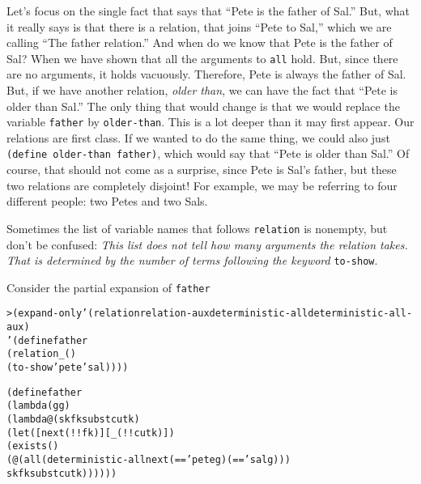 Let's focus on the single fact that says that ``Pete is the father of
Sal.''  But, what it really says is that there is a relation, that
joins ``Pete to Sal,'' which we are calling ``The father relation.''
And when do we know that Pete is the father of Sal?  When we have
shown that all the arguments to \texttt{all} hold.  But, since there
are no arguments, it holds vacuously.  Therefore, Pete is always the
father of Sal.  But, if we have another relation, \emph{older than},
we can have the fact that ``Pete is older than Sal.''  The only thing
that would change is that we would replace the variable
\texttt{father} by \texttt{older-than}.  This is a lot deeper than it
may first appear.  Our relations are first class.  If we wanted to do
the same thing, we could also just \texttt{(define older-than
father)}, which would say that ``Pete is older than Sal.''  Of course,
that should not come as a surprise, since Pete is Sal's father, but
these two relations are completely disjoint!  For example, we may be
referring to four different people: two Petes and two Sals.

Sometimes the list of variable names that follows \texttt{relation} is
nonempty, but don't be confused: \emph{This list does not tell how
many arguments the relation takes. That is determined by the number of
terms following the keyword} \texttt{to-show}.

Consider the partial expansion of \texttt{father}
\begin{alltt}
> (expand-only '(relation relation-aux deterministic-all deterministic-all-aux)
    '(define father  
       (relation _ ()
         (to-show 'pete 'sal))))
\end{alltt}

\begin{alltt}
(define father
  (lambda (g g)
    (lambda@ (sk fk subst cutk)
      (let ([next (!! fk)] [_ (!! cutk)])
        (exists ()
          (@ (all (deterministic-all next (== 'pete g) (== 'sal g)))
             sk fk subst cutk))))))
\end{alltt}

